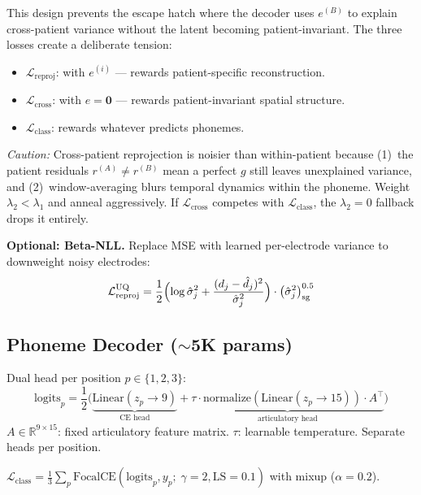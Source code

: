 \documentclass[11pt,letterpaper]{article}
\newcommand{\R}{\mathbb{R}}
\begin{document}
This design prevents the escape hatch where the decoder uses $e^{(B)}$ to explain cross-patient variance without the latent becoming patient-invariant. The three losses create a deliberate tension:
\begin{itemize}[leftmargin=2em]
\item $\mathcal{L}_{\text{reproj}}$: with $e^{(i)}$ --- rewards patient-specific reconstruction.
\item $\mathcal{L}_{\text{cross}}$: with $e{=}\mathbf{0}$ --- rewards patient-invariant spatial structure.
\item $\mathcal{L}_{\text{class}}$: rewards whatever predicts phonemes.
\end{itemize}

\textcolor{BrickRed}{\textit{Caution:} Cross-patient reprojection is noisier than within-patient because (1)~the patient residuals $r^{(A)} \neq r^{(B)}$ mean a perfect $g$ still leaves unexplained variance, and (2)~window-averaging blurs temporal dynamics within the phoneme. Weight $\lambda_2 < \lambda_1$ and anneal aggressively. If $\mathcal{L}_{\text{cross}}$ competes with $\mathcal{L}_{\text{class}}$, the $\lambda_2{=}0$ fallback drops it entirely.}

\textbf{Optional: Beta-NLL.} Replace MSE with learned per-electrode variance to downweight noisy electrodes:
\begin{equation}
\mathcal{L}_{\text{reproj}}^{\text{UQ}} = \frac{1}{2}\Bigl(\log \hat{\sigma}_j^2 + \frac{(d_j - \hat{d}_j)^2}{\hat{\sigma}_j^2}\Bigr) \cdot \bigl(\hat{\sigma}_j^2\bigr)^{0.5}_{\text{sg}}
\end{equation}


\subsection{Phoneme Decoder (${\sim}$5K params)}

Dual head per position $p \in \{1,2,3\}$:
\begin{equation}
\text{logits}_p = \frac{1}{2}\bigl(\underbrace{\text{Linear}(z_p \to 9)}_{\text{CE head}} + \underbrace{\tau \cdot \text{normalize}(\text{Linear}(z_p \to 15)) \cdot A^\top}_{\text{articulatory head}}\bigr)
\end{equation}
$A \in \R^{9 \times 15}$: fixed articulatory feature matrix. $\tau$: learnable temperature. Separate heads per position.

$\mathcal{L}_{\text{class}} = \frac{1}{3}\sum_{p} \text{FocalCE}(\text{logits}_p, y_p;\; \gamma{=}2, \text{LS}{=}0.1)$ with mixup ($\alpha{=}0.2$).
\end{document}
